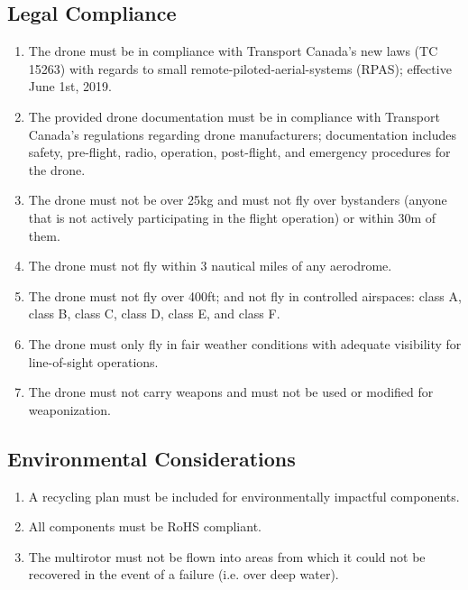 \documentclass[10pt,letterpaper]{article}
\begin{document}
\subsection{Legal Compliance}
\begin{enumerate}[label=C.LC.\arabic*, wide=1cm, widest=3cm, leftmargin=*, font=\bfseries, noitemsep,topsep=0pt, parsep=4pt, partopsep=0pt]
    \item The drone must be in compliance with Transport Canada's new laws (TC 15263) with regards to small remote-piloted-aerial-systems (RPAS); effective June 1st, 2019.
    \item The provided drone documentation must be in compliance with Transport Canada's regulations regarding drone manufacturers; documentation includes safety, pre-flight, radio, operation, post-flight, and emergency procedures for the drone.
    \item The drone must not be over 25kg and must not fly over bystanders (anyone that is not actively participating in the flight operation) or within 30m of them.
    \item The drone must not fly within 3 nautical miles of any aerodrome.
    \item The drone must not fly over 400ft; and not fly in controlled airspaces: class A, class B, class C, class D, class E, and class F.
    \item The drone must only fly in fair weather conditions with adequate visibility for line-of-sight operations.
    \item The drone must not carry weapons and must not be used or modified for weaponization.
\end{enumerate}

\subsection{Environmental Considerations}
\begin{enumerate}[label=C.EN.\arabic*, wide=1cm, widest=3cm, leftmargin=*, font=\bfseries, noitemsep,topsep=0pt, parsep=4pt, partopsep=0pt]
    \item A recycling plan must be included for environmentally impactful components.
    \item All components must be RoHS compliant.
    \item The multirotor must not be flown into areas from which it could not be recovered in the event of a failure (i.e. over deep water).
\end{enumerate}
\end{document}
